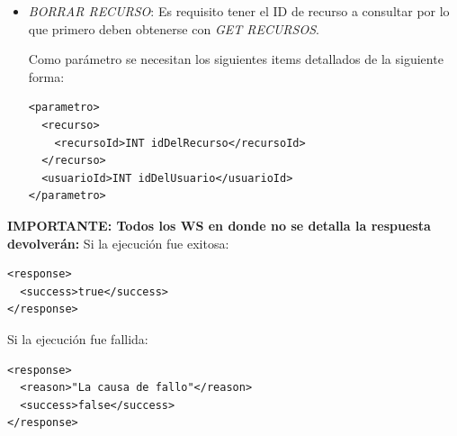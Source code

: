 \documentclass{article}
\begin{document}
\begin{description}
\begin{itemize}
			
			\item \emph{BORRAR RECURSO}:  Es requisito tener el ID de recurso a consultar por lo que primero deben obtenerse con \emph{GET RECURSOS}.

Como par\'ametro se necesitan los siguientes items detallados de la siguiente forma:
				
\begin{lstlisting}
<parametro>
  <recurso>
    <recursoId>INT idDelRecurso</recursoId>
  </recurso>
  <usuarioId>INT idDelUsuario</usuarioId>
</parametro>
\end{lstlisting}
		
				
		\end{itemize}
		
\textbf{IMPORTANTE: Todos los WS en donde no se detalla la respuesta devolver\'an:}
\newline
\newline
Si la ejecuci\'on fue exitosa:

\begin{lstlisting}
<response>
  <success>true</success>
</response>
\end{lstlisting}

Si la ejecuci\'on fue fallida:

\begin{lstlisting}
<response>
  <reason>"La causa de fallo"</reason>
  <success>false</success>
</response>
\end{lstlisting}
		

\end{description}
\end{document}
